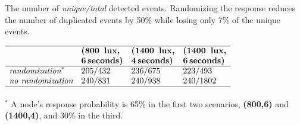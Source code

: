 \begin{table}
	\centering
    \caption{The number of \textit{unique/total} detected events.
    Randomizing the response reduces the number of duplicated events by 50\% while losing only 7\% of the unique events.}
    \label{tab:regular_rand}
    $
    \begin{array}{llll}\hline
     & \textbf{(800\, lux,} & \textbf{(1400\, lux,}& \textbf{(1400\, lux,} \\
     & \textbf{6\,seconds)} & \textbf{4\,seconds)} & \textbf{6\,seconds)} \\\hline
     \textit{randomization}^{*} & 205/432 &  236/675 & 223/493  \\
     \textit{no randomization} & 240/831 &  240/938 & 240/1802 \\\hline
    \vspace{-2ex} \\
    \end{array}
    $
    \parbox{0.8\linewidth}{
    $^{*}$ A node's response probability is 65\% in the first two scenarios,
    \textbf{(800,6)} and \textbf{(1400,4)}, and 30\% in the third.}
\end{table}
%
